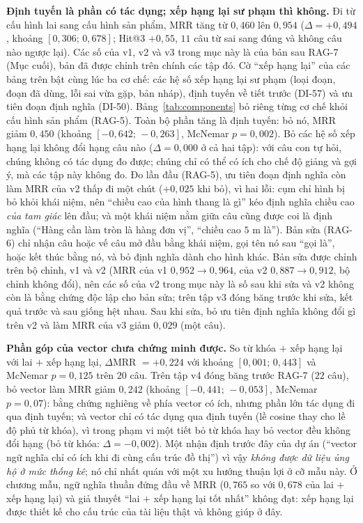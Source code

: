 \textbf{Định tuyến là phần có tác dụng; xếp hạng lại sư phạm thì không.} Đi từ cấu hình lai sang cấu hình sản phẩm, MRR tăng từ $0{,}460$ lên $0{,}954$ ($\Delta=+0{,}494$, khoảng $[0{,}306;\,0{,}678]$; Hit@3 $+0{,}55$, $11$ câu từ sai sang đúng và không câu nào ngược lại). Các số của v1, v2 và v3 trong mục này là của bản sau RAG-7 (Mục cuối), bản đã được chỉnh trên chính các tập đó. Cờ ``xếp hạng lại'' của các bảng trên bật cùng lúc ba cơ chế: các hệ số xếp hạng lại sư phạm (loại đoạn, đoạn đã dùng, lỗi sai vừa gặp, bản nháp), định tuyến về tiết trước (DI-57) và ưu tiên đoạn định nghĩa (DI-50). Bảng~\ref{tab:components} bỏ riêng từng cơ chế khỏi cấu hình sản phẩm (RAG-5). Toàn bộ phần tăng là định tuyến: bỏ nó, MRR giảm $0{,}450$ (khoảng $[-0{,}642;\,-0{,}263]$, McNemar $p=0{,}002$). Bỏ các hệ số xếp hạng lại không đổi hạng câu nào ($\Delta=0{,}000$ ở cả hai tập): với câu con tự hỏi, chúng không có tác dụng đo được; chúng chỉ có thể có ích cho chế độ giảng và gợi ý, mà các tập này không đo. Đo lần đầu (RAG-5), ưu tiên đoạn định nghĩa còn làm MRR của v2 thấp đi một chút ($+0{,}025$ khi bỏ), vì hai lỗi: cụm chỉ hình bị bỏ khỏi khái niệm, nên ``chiều cao của hình thang là gì'' kéo định nghĩa chiều cao \emph{của tam giác} lên đầu; và một khái niệm nằm giữa câu cũng được coi là định nghĩa (``Hàng cần làm tròn là hàng đơn vị'', ``chiều cao $5$ m là''). Bản sửa (RAG-6) chỉ nhận câu hoặc vế câu mở đầu bằng khái niệm, gọi tên nó sau ``gọi là'', hoặc kết thúc bằng nó, và bỏ định nghĩa dành cho hình khác. Bản sửa được chỉnh trên bộ chỉnh, v1 và v2 (MRR của v1 $0{,}952\to0{,}964$, của v2 $0{,}887\to0{,}912$, bộ chỉnh không đổi), nên các số của v2 trong mục này là số sau khi sửa và v2 không còn là bằng chứng độc lập cho bản sửa; trên tập v3 đóng băng trước khi sửa, kết quả trước và sau giống hệt nhau. Sau khi sửa, bỏ ưu tiên định nghĩa không đổi gì trên v2 và làm MRR của v3 giảm $0{,}029$ (một câu).

\textbf{Phần góp của vector chưa chứng minh được.} So từ khóa $+$ xếp hạng lại với lai $+$ xếp hạng lại, $\Delta$MRR $=+0{,}224$ với khoảng $[0{,}001;\,0{,}443]$ và McNemar $p=0{,}125$ trên $20$ câu. Trên tập v4 đóng băng trước RAG-7 ($22$ câu), bỏ vector làm MRR giảm $0{,}242$ (khoảng $[-0{,}441;\,-0{,}053]$, McNemar $p=0{,}07$): bằng chứng nghiêng về phía vector có ích, nhưng phần lớn tác dụng đi qua định tuyến; và vector chỉ có tác dụng qua định tuyến (lề cosine thay cho lề độ phủ từ khóa), vì trong phạm vi một tiết bỏ từ khóa hay bỏ vector đều không đổi hạng (bỏ từ khóa: $\Delta=-0{,}002$). Một nhận định trước đây của dự án (``vector ngữ nghĩa chỉ có ích khi đi cùng cấu trúc đồ thị'') vì vậy \emph{không được dữ liệu ủng hộ ở mức thống kê}; nó chỉ nhất quán với một xu hướng thuận lợi ở cỡ mẫu này. Ở chương mẫu, ngữ nghĩa thuần đứng đầu về MRR ($0{,}765$ so với $0{,}678$ của lai $+$ xếp hạng lại) và giả thuyết ``lai $+$ xếp hạng lại tốt nhất'' không đạt: xếp hạng lại được thiết kế cho cấu trúc của tài liệu thật và không giúp ở đây.

